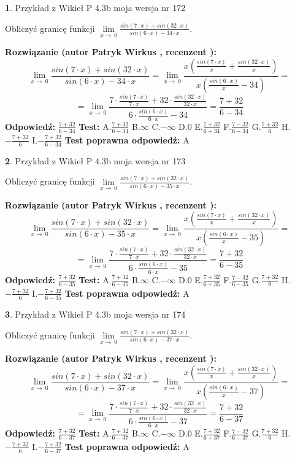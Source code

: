 \documentclass[12pt, a4paper]{article}
\theoremstyle{definition} %
\newtheorem{zad}{}
\newcommand{\zadStart}[1]{\begin{zad}#1\newline}
\newcommand{\zadStop}{\end{zad}}
\newcommand{\rozwStart}[2]{\noindent \textbf{Rozwiązanie (autor #1 , recenzent #2): }\newline}
\newcommand{\rozwStop}{\newline}
\newcommand{\odpStart}{\noindent \textbf{Odpowiedź:}\newline}
\newcommand{\odpStop}{\newline}
\newcommand{\testStart}{\noindent \textbf{Test:}\newline}
\newcommand{\testStop}{\newline}
\newcommand{\kluczStart}{\noindent \textbf{Test poprawna odpowiedź:}\newline}
\newcommand{\kluczStop}{\newline}
\begin{document}
\zadStart{Przykład z Wikieł P 4.3b moja wersja nr 172}


Obliczyć granicę funkcji $\lim\limits_{x\to\ 0}\frac{sin(7 \cdot x)+sin(32 \cdot x)}{sin(6 \cdot x)-34 \cdot x}$.
\zadStop
\rozwStart{Patryk Wirkus}{}
$$\lim\limits_{x\to\ 0}\frac{sin(7 \cdot x)+sin(32 \cdot x)}{sin(6 \cdot x)-34 \cdot x}=\lim\limits_{x\to\ 0}\frac{x(\frac{sin(7 \cdot x)}{x}+\frac{sin(32 \cdot x)}{x})}{x(\frac{sin(6 \cdot x)}{x}-34)}=$$
$$=\lim\limits_{x\to\ 0}\frac{7 \cdot \frac{sin(7 \cdot x)}{7 \cdot x}+32 \cdot \frac{sin(32 \cdot x)}{32 \cdot x}}{6 \cdot \frac{sin(6 \cdot x)}{6 \cdot x}-34}=\frac{7+32}{6-34}$$
\rozwStop
\odpStart
$\frac{7+32}{6-34}$
\odpStop
\testStart
A.$\frac{7+32}{6-34}$
B.$\infty$
C.$-\infty$
D.$0$
E.$\frac{7+32}{6+34}$
F.$\frac{7-32}{6-34}$
G.$\frac{7+32}{6}$
H.$-\frac{7+32}{6}$
I.$-\frac{7+32}{6-34}$
\testStop
\kluczStart
A
\kluczStop



\zadStart{Przykład z Wikieł P 4.3b moja wersja nr 173}


Obliczyć granicę funkcji $\lim\limits_{x\to\ 0}\frac{sin(7 \cdot x)+sin(32 \cdot x)}{sin(6 \cdot x)-35 \cdot x}$.
\zadStop
\rozwStart{Patryk Wirkus}{}
$$\lim\limits_{x\to\ 0}\frac{sin(7 \cdot x)+sin(32 \cdot x)}{sin(6 \cdot x)-35 \cdot x}=\lim\limits_{x\to\ 0}\frac{x(\frac{sin(7 \cdot x)}{x}+\frac{sin(32 \cdot x)}{x})}{x(\frac{sin(6 \cdot x)}{x}-35)}=$$
$$=\lim\limits_{x\to\ 0}\frac{7 \cdot \frac{sin(7 \cdot x)}{7 \cdot x}+32 \cdot \frac{sin(32 \cdot x)}{32 \cdot x}}{6 \cdot \frac{sin(6 \cdot x)}{6 \cdot x}-35}=\frac{7+32}{6-35}$$
\rozwStop
\odpStart
$\frac{7+32}{6-35}$
\odpStop
\testStart
A.$\frac{7+32}{6-35}$
B.$\infty$
C.$-\infty$
D.$0$
E.$\frac{7+32}{6+35}$
F.$\frac{7-32}{6-35}$
G.$\frac{7+32}{6}$
H.$-\frac{7+32}{6}$
I.$-\frac{7+32}{6-35}$
\testStop
\kluczStart
A
\kluczStop



\zadStart{Przykład z Wikieł P 4.3b moja wersja nr 174}


Obliczyć granicę funkcji $\lim\limits_{x\to\ 0}\frac{sin(7 \cdot x)+sin(32 \cdot x)}{sin(6 \cdot x)-37 \cdot x}$.
\zadStop
\rozwStart{Patryk Wirkus}{}
$$\lim\limits_{x\to\ 0}\frac{sin(7 \cdot x)+sin(32 \cdot x)}{sin(6 \cdot x)-37 \cdot x}=\lim\limits_{x\to\ 0}\frac{x(\frac{sin(7 \cdot x)}{x}+\frac{sin(32 \cdot x)}{x})}{x(\frac{sin(6 \cdot x)}{x}-37)}=$$
$$=\lim\limits_{x\to\ 0}\frac{7 \cdot \frac{sin(7 \cdot x)}{7 \cdot x}+32 \cdot \frac{sin(32 \cdot x)}{32 \cdot x}}{6 \cdot \frac{sin(6 \cdot x)}{6 \cdot x}-37}=\frac{7+32}{6-37}$$
\rozwStop
\odpStart
$\frac{7+32}{6-37}$
\odpStop
\testStart
A.$\frac{7+32}{6-37}$
B.$\infty$
C.$-\infty$
D.$0$
E.$\frac{7+32}{6+37}$
F.$\frac{7-32}{6-37}$
G.$\frac{7+32}{6}$
H.$-\frac{7+32}{6}$
I.$-\frac{7+32}{6-37}$
\testStop
\kluczStart
A
\kluczStop
\end{document}
